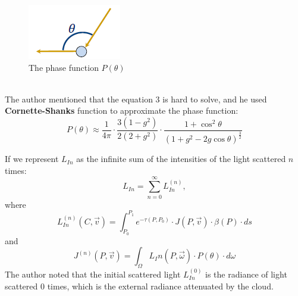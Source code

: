 \begin{figure}[htp]
\begin{center}
\includegraphics[scale=1.0]{images/phasefunction.png}
\caption{The phase function $P(\theta)$}
\label{f7}
\end{center}
\end{figure}
\\The author mentioned that the equation 3 is hard to solve, and he used \textbf{Cornette-Shanks} function to approximate the phase function:
\begin{equation}
P(\theta) \approx \frac{1}{4\pi} \cdot \frac{3(1-g^2)}{2(2+g^2)} \cdot \frac{1+\cos^2 {\theta}}{(1+g^2-2g\cos{\theta})^{\frac{3}{2}}}
\end{equation}

If we represent $L_{In}$ as the infinite sum of the intensities of the light scattered $n$ times:
\begin{equation}
L_{In} = \sum_{n=0}^{\infty}L_{In}^{(n)},
\end{equation}
where
\begin{equation}
L_{In}^{(n)}(C, \vec{v}) = \int_{P_0}^{P_1}e^{-\tau(P, P_0)} \cdot J(P, \vec{v}) \cdot \beta(P) \cdot ds
\end{equation}
and
\begin{equation}
J^{(n)}(P, \vec{v}) = \int_{\Omega}L_In(P, \vec{\omega}) \cdot P(\theta) \cdot d\omega
\end{equation}
The author noted that the initial scattered light $L_{In}^{(0)}$ is the radiance of light scattered 0 times, which is the external radiance attenuated by the cloud.